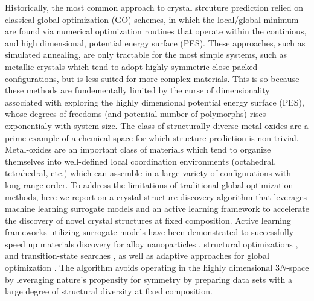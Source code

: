 %
Historically, the most common approach to crystal strcuture prediction relied on classical global optimization (GO) schemes,
in which the local/global minimum are found via numerical optimization routines that operate within the continious, and high dimensional, potential energy surface (PES).
%
These approaches, such as simulated annealing, are only tractable for the most simple systems,
such as metallic crystals which tend to adopt highly symmetric close-packed configurations, but is less suited for more complex materials.
%
This is so because these methods are fundementally limited by the curse of dimensionality associated with exploring the highly dimensional potential energy surface (PES),
whose degrees of freedoms (and potential number of polymorphs) rises exponentialy with system size.\cite{Stillinger1999}
%
The class of structurally diverse metal-oxides are a prime example of a chemical space for which structure prediction is non-trivial.
%
Metal-oxides are an important class of materials which tend to organize themselves into well-defined local coordination environments (octahedral, tetrahedral, etc.) which can assemble in a large variety of configurations with long-range order.
%
To address the limitations of traditional global optimization methods,
here we report on a crystal structure discovery algorithm that leverages machine learning surrogate models and an active learning framework to accelerate the discovery of novel crystal structures at fixed composition.
%
Active learning frameworks utilizing surrogate models have been demonstrated to successfully speed up materials discovery for alloy nanoparticles \cite{Jennings2019}, structural optimizations \cite{hansen2019atomistic}, and transition-state searches \cite{torres2019low}, as well as adaptive approaches for global optimization \cite{VanDenBossche2018}.
%
The algorithm avoids operating in the highly dimensional $3N$-space by leveraging nature's propensity for symmetry by preparing data sets with a large degree of structural diversity at fixed composition.
